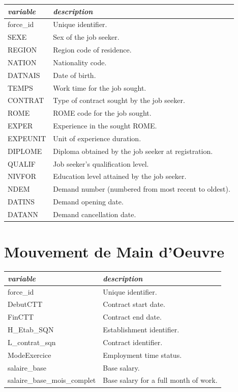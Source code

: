 \documentclass[10pt, a4paper]{article}
\begin{document}
\begin{longtable}{p{4cm}|p{8.5cm}}
\toprule
\textit{variable} & \textit{description} \\
\midrule
force\_id & Unique identifier. \\
SEXE & Sex of the job seeker.\\
REGION & Region code of residence.\\
NATION & Nationality code.\\
DATNAIS & Date of birth. \\
TEMPS & Work time for the job sought. \\
CONTRAT & Type of contract sought by the job seeker. \\
ROME & ROME code for the job sought. \\
EXPER & Experience in the sought ROME. \\
EXPEUNIT & Unit of experience duration.\\
DIPLOME & Diploma obtained by the job seeker at registration.\\
QUALIF & Job seeker's qualification level. \\
NIVFOR & Education level attained by the job seeker. \\
NDEM & Demand number (numbered from most recent to oldest). \\
DATINS & Demand opening date. \\
DATANN & Demand cancellation date. \\
\bottomrule
\end{longtable}

\section*{Mouvement de Main d'Oeuvre}

\begin{longtable}{p{4cm}|p{8.5cm}}
\toprule
\textit{variable} & \textit{description} \\
\midrule
force\_id & Unique identifier.  \\
DebutCTT & Contract start date. \\
FinCTT & Contract end date. \\
H\_Etab\_SQN & Establishment identifier.\\
L\_contrat\_sqn & Contract identifier. \\
ModeExercice & Employment time status.\\
salaire\_base & Base salary.\\
salaire\_base\_mois\_complet & Base salary for a full month of work. \\
\bottomrule
\end{longtable}
\end{document}
